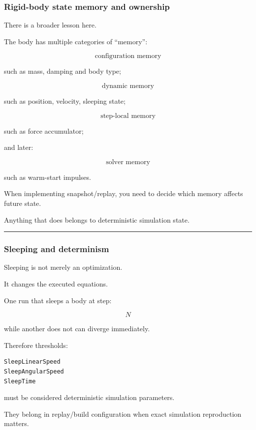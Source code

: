 \subsubsection{Rigid-body state memory and ownership}\label{rigid-body-state-memory-and-ownership}

There is a broader lesson here.

The body has multiple categories of ``memory'':

\[
\boxed{
\text{configuration memory}
}
\]

such as mass, damping and body type;

\[
\boxed{
\text{dynamic memory}
}
\]

such as position, velocity, sleeping state;

\[
\boxed{
\text{step-local memory}
}
\]

such as force accumulator;

and later:

\[
\boxed{
\text{solver memory}
}
\]

such as warm-start impulses.

When implementing snapshot/replay, you need to decide which memory affects future state.

Anything that does belongs to deterministic simulation state.

\begin{center}\rule{0.5\linewidth}{0.5pt}\end{center}

\subsubsection{Sleeping and determinism}\label{sleeping-and-determinism}

Sleeping is not merely an optimization.

It changes the executed equations.

One run that sleeps a body at step:

\[
N
\]

while another does not can diverge immediately.

Therefore thresholds:

\begin{verbatim}
SleepLinearSpeed
SleepAngularSpeed
SleepTime
\end{verbatim}

must be considered deterministic simulation parameters.

They belong in replay/build configuration when exact simulation reproduction matters.

